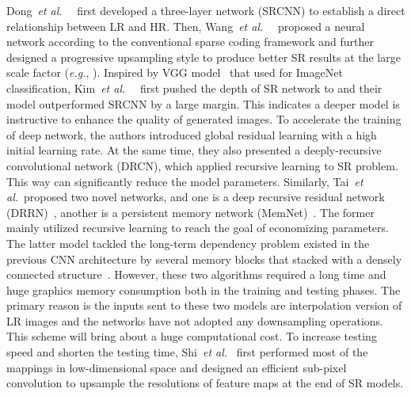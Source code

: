 \documentclass[sigconf]{acmart}
\newcommand{\etal}{\emph{et al.}~}
\newcommand{\eg}{\emph{e.g.}}
\begin{document}
Dong~\etal~\cite{SRCNN,SRCNN-Ex} first developed a three-layer network (SRCNN) to establish a direct relationship between LR and HR. Then, Wang~\etal~\cite{CSCN} proposed a neural network according to the conventional sparse coding framework and further designed a progressive upsampling style to produce better SR results at the large scale factor (\eg, ). Inspired by VGG model~\cite{VGG} that used for ImageNet classification, Kim~\etal~\cite{VDSR,DRCN} first pushed the depth of SR network to  and their model outperformed SRCNN by a large margin. This indicates a deeper model is instructive to enhance the quality of generated images. To accelerate the training of deep network, the authors introduced global residual learning with a high initial learning rate. At the same time, they also presented a deeply-recursive convolutional network (DRCN), which applied recursive learning to SR problem. This way can significantly reduce the model parameters. Similarly, Tai~\etal proposed two novel networks, and one is a deep recursive residual network (DRRN)~\cite{DRRN}, another is a persistent memory network (MemNet)~\cite{MemNet}. The former mainly utilized recursive learning to reach the goal of economizing parameters. The latter model tackled the long-term dependency problem existed in the previous CNN architecture by several memory blocks that stacked with a densely connected structure~\cite{DenseNet}. However, these two algorithms required a long time and huge graphics memory consumption both in the training and testing phases. The primary reason is the inputs sent to these two models are interpolation version of LR images and the networks have not adopted any downsampling operations. This scheme will bring about a huge computational cost. To increase testing speed and shorten the testing time, Shi~\etal\cite{ESPCN} first performed most of the mappings in low-dimensional space and designed an efficient sub-pixel convolution to upsample the resolutions of feature maps at the end of SR models.
\end{document}
